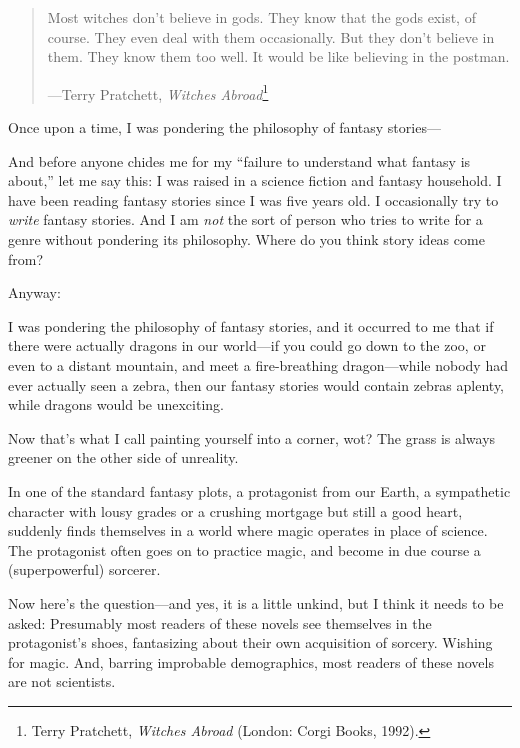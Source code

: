 
\begin{quote}
{
 Most witches don't believe in gods. They know that
the gods exist, of course. They even deal with them occasionally. But
they don't believe in them. They know them too well. It
would be like believing in the postman.}

{\raggedleft
 {}---Terry Pratchett, \textit{Witches Abroad}\footnote{Terry Pratchett, \textit{Witches Abroad} (London: Corgi Books,
1992).}
\par}
\end{quote}

{
 Once upon a time, I was pondering the philosophy of fantasy
stories---}

{
 And before anyone chides me for my ``failure to
understand what fantasy is about,'' let me say this:
I was raised in a science fiction and fantasy household. I have been
reading fantasy stories since I was five years old. I occasionally try
to \textit{write} fantasy stories. And I am \textit{not} the sort of
person who tries to write for a genre without pondering its philosophy.
Where do you think story ideas come from?}

{
 Anyway:}

{
 I was pondering the philosophy of fantasy stories, and it occurred
to me that if there were actually dragons in our world---if you could
go down to the zoo, or even to a distant mountain, and meet a
fire-breathing dragon---while nobody had ever actually seen a zebra,
then our fantasy stories would contain zebras aplenty, while dragons
would be unexciting.}

{
 Now that's what I call painting yourself into a
corner, wot? The grass is always greener on the other side of
unreality.}

{
 In one of the standard fantasy plots, a protagonist from our
Earth, a sympathetic character with lousy grades or a crushing mortgage
but still a good heart, suddenly finds themselves in a world where
magic operates in place of science. The protagonist often goes on to
practice magic, and become in due course a (superpowerful) sorcerer.}

{
 Now here's the question---and yes, it is a little
unkind, but I think it needs to be asked: Presumably most readers of
these novels see themselves in the protagonist's shoes,
fantasizing about their own acquisition of sorcery. Wishing for magic.
And, barring improbable demographics, most readers of these novels are
not scientists.}

